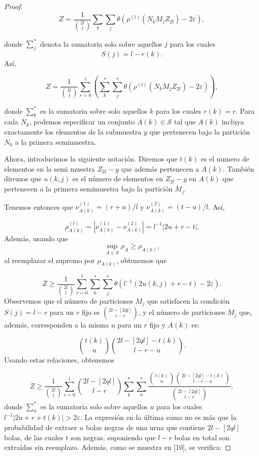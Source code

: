 \documentclass{report}
\begin{document}
\begin{proof}
\[
Z = \frac{1}{\binom{2l}{l}} \sum_k \sum_j \theta ( \rho^{(l)} (N_k M_j Z_{2l}) - 2\varepsilon ),
\]

donde \( \sum_j^* \) denota la sumatoria solo sobre aquellos \( j \) para los cuales 
\[
S(j) = l - r(k).
\]
Así,

\[
Z = \frac{1}{\binom{2l}{l}} \sum_{r=0}^{l} \left( \sum_k^* \sum_j^* \theta ( \rho^{(l)} (N_k M_j Z_{2l}) - 2\varepsilon ) \right),
\]

donde \( \sum_k^* \) es la sumatoria sobre solo aquellos \( k \) para los cuales \( r(k) = r \).
Para cada \( N_k \), podemos especificar un conjunto \( A(k) \in \mathcal{S} \) tal que \( A(k) \) incluya exactamente
los elementos de la submuestra \( y \) que pertenecen bajo la partición \( N_k \) a la primera semimuestra.\newline

Ahora, introducimos la siguiente notación. Diremos que $t(k)$ es el numero de elementos en la semi muestra $Z_{2l} - y$ que
además pertenecen a $A(k)$. También diremos que  \( u(k,j) \) es el número de elementos en \( Z_{2l} - y \) en \( A(k) \)
que pertenecen a la primera semimuestra bajo la partición \( M_j \).\newline

Tenemos entonces que \( \nu_{A(k)}^{(1)} = (r + u)/l \) y \( \nu_{A(k)}^{(2)} = (t - u)/l \).
Así, 

\[
\rho^{(l)}_{A(k)} = |\nu_{A(k)}^{(1)} - \nu_{A(k)}^{(2)}| = l^{-1} | 2u + r - t |.
\]
Además, usando que 
\[ 
\sup_{A \in \mathcal{S}} \rho_A \geq \rho_{A(k)},
\] 
al reemplazar el supremo por $\rho_{A(k)}$, obtenemos que

\[
Z \geq \frac{1}{\binom{2l}{l}} \sum_{r=0}^{l} \sum_k^* \sum_j^* \theta ( l^{-1} (2u(k,j) + r - t) - 2\varepsilon ).
\]
Observemos que el número de particiones \( M_j \) que satisfacen la condición \( S(j) = l - r \) para un \( r \) fijo es
\( \binom{2l - [2q l]}{l - r} \), y el número de particiones \( M_j \) que, además, corresponden a la misma \( u \) para un \( r \) fijo
y \( A(k) \) es:

\[
\binom{t(k)}{u} \binom{2l - [2q l] - t(k)}{l - r - u}.
\]
Usando estas relaciones, obtenemos

\[
Z \geq \frac{1}{\binom{2l}{l}} \sum_{r=0}^{l} \binom{2l - [2q l]}{l - r} \sum_k^* \sum_u^* \frac{\binom{t(k)}{u} \binom{2l - [2q l] - t(k)}{l - r - u}}{\binom{2l - [2q l]}{l - r}},
\]
donde \( \sum_u^* \) es la sumatoria solo sobre aquellos \( u \) para los cuales \( l^{-1} |2u + r + t(k)| > 2\varepsilon \).
La expresión en la última suma no es más que la probabilidad de extraer \( u \) bolas negras de una urna que contiene
\( 2l - [2q l] \) bolas, de las cuales \( t \) son negras, suponiendo que \( l - r \) bolas en total son extraídas sin reemplazo.
Además, como se muestra en [10], se verifica: 


\end{proof}
\end{document}
